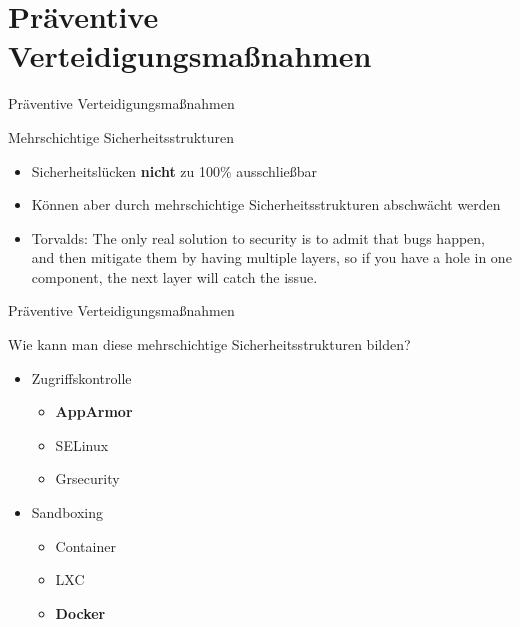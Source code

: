 \newcommand{\gqq}[1]{\glqq#1\grqq}

\section{Präventive Verteidigungsmaßnahmen}

\begin{frame}{Präventive Verteidigungsmaßnahmen}
  \begin{block}{Mehrschichtige Sicherheitsstrukturen}
    \begin{itemize}[<+->]
      \item Sicherheitslücken \textbf{nicht} zu 100\% ausschließbar
      \item Können aber durch mehrschichtige Sicherheitsstrukturen abschwächt werden
      \item Torvalds: \gqq{The only real solution to security is to admit that bugs happen, and then mitigate them by having multiple layers, so if you have a hole in one component, the next layer will catch the issue.} \footnotemark
    \end{itemize}
  \end{block}

\end{frame}

\begin{frame}{Präventive Verteidigungsmaßnahmen}
  \begin{block}{Wie kann man diese mehrschichtige Sicherheitsstrukturen bilden?}
    \begin{itemize}[<+->]
      \item Zugriffskontrolle
      \begin{itemize}[<+->]
        \item \textbf{AppArmor}
        \item SELinux
        \item Grsecurity
      \end{itemize}
      \item Sandboxing
      \begin{itemize}[<+->]
        \item Container
        \item LXC
        \item \textbf{Docker}
      \end{itemize}
    \end{itemize}
  \end{block}
\end{frame}

